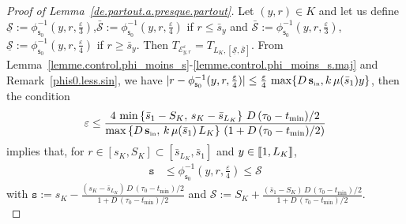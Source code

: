 \documentclass[10pt]{amsart}
\theoremstyle{definition}\newtheorem{defi}[theo]{Definition}\newtheorem{rema}[theo]{Remark}\newtheorem{exam}[theo]{Example}\newtheorem{exem}[theo]{Example}\newtheorem{nota}[theo]{Notation}
\newcommand{\llbracket}{\mathopen{[\mkern -2.7mu[}}
\newcommand{\rrbracket}{\mathclose{]\mkern -2.7mu]}}
\newcommand{\clE}{\mathcal{E}}
\newcommand{\clS}{\mathcal{S}}
\newcommand{\Sin}{{\mathbf s}_{\textrm{\tiny\rm in}}}
\newcommand{\Smin}{\underline{\mathcal{S}}}
\newcommand{\Smax}{\bar{\mathcal{S}}}
\newcommand{\SminK}{s_K}
\newcommand{\SmaxK}{S_K}
\newcommand{\barmu}{\mu(\bar s_1)}
\newcommand{\phis}{\phi_{\textsf{s}_0}^{-1}}
\newcommand{\lmax}{{L_K}}
\newcommand{\setunlmax}{\llbracket 1, \lmax\rrbracket}
\newcommand{\1}{\mathbf{1}}
\begin{document}
\begin{proof}[Proof of Lemma~\ref{de.partout.a.presque.partout}]
Let $(y,r)\in K$ and let us define $\Smin:=\phis(y,r,\frac{\varepsilon}{3})$,\linebreak $\Smax:=\phis(y,r,\frac{\varepsilon}{4})$ if $r\leq \bar s_y$ and $\Smax:= \phis(y,r,\frac{\varepsilon}{3})$, $\Smin:= \phis(y,r,\frac{\varepsilon}{4})$ if $r\geq \bar s_y$. Then $T_{\clE_{y,r}^\varepsilon}=T_{\lmax,[\Smin,\Smax]}$. From Lemma~\ref{lemme.control.phi_moins_s}-\ref{lemme.control.phi_moins_s.maj} and Remark~\ref{phis0.less.sin}, we have $|r-\phis(y,r,\frac{\varepsilon}{4})|\leq \frac{\varepsilon}{4}\,\max\{D\,\Sin,k\,\barmu y\}$, then the condition
\[
\varepsilon\leq\frac{4\,\min\left\{\bar s_1-\SmaxK,\, \SminK-\bar s_{\lmax}\right\}\,D\,(\tau_0-t_{\min})/2}{\max\left\{D\,\Sin,\, k\,\barmu\,\lmax\right\}\,\left(1+D\,(\tau_0-t_{\min})/2\right)}
\]
implies that, for $r\in [\SminK,\SmaxK]\subset [\bar s_\lmax,\bar s_1]$ and $y\in \setunlmax$,
\begin{align}\label{encadre.eps4}
\texttt{s} &\leq \phis\left(y,r,\frac{\varepsilon}{4}\right)
\leq \clS
\end{align}
with $\texttt{s}:=\SminK-\frac{(\SminK-\bar s_{\lmax})\,D\,(\tau_0-t_{\min})/2}{1+D\,(\tau_0-t_{\min})/2}$ and $\clS:= \SmaxK+\frac{(\bar s_1-\SmaxK)\,D\,(\tau_0-t_{\min})/2}{1+D\,(\tau_0-t_{\min})/2}$.\\


\end{proof}
\end{document}
